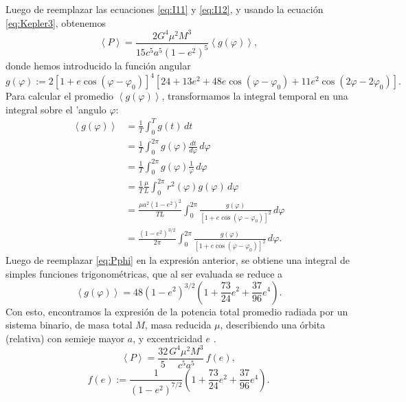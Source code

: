Luego de reemplazar las ecuaciones \ref{eq:I11} y \ref{eq:I12}, y usando la ecuación \ref{eq:Kepler3}, obtenemos
\begin{equation*}
\left\langle P\right\rangle = \frac{2G^4\mu^2M^3}{15c^5a^5\left(1-e^2\right)^{5}}\left\langle g(\varphi)\right\rangle ,
\end{equation*}
donde hemos introducido la función angular
\begin{equation}\label{eq:Pphi}
g(\varphi):=2\left[1+e\cos(\varphi-\varphi_0)\right]^4
\left[24+13e^2+48e\cos(\varphi-\varphi_0) +11e^2\cos(2\varphi-2\varphi_0)\right].
\end{equation}
Para calcular el promedio $\left\langle g(\varphi)\right\rangle$, transformamos la integral temporal en una integral sobre el 'angulo $\varphi$:
\begin{align*}
\left\langle g(\varphi)\right\rangle &= \frac{1}{T}\int_0^T g(t)\,dt \\
&= \frac{1}{T}\int_0^{2\pi} g(\varphi)\frac{dt}{d\varphi}\,d\varphi \\
&= \frac{1}{T}\int_0^{2\pi} g(\varphi)\frac{1}{\dot{\varphi}}\,d\varphi \\
&= \frac{1}{T}\frac{\mu}{L}\int_0^{2\pi} r^2(\varphi)g(\varphi)\,d\varphi \\
&= \frac{\mu a^2(1-e^2)^2}{TL}\int_0^{2\pi} \frac{g(\varphi)}{\left[1+e\cos(\varphi-\varphi_0)\right]^2}\,d\varphi \\
&= \frac{(1-e^2)^{3/2}}{2\pi}\int_0^{2\pi} \frac{g(\varphi)}{\left[1+e\cos(\varphi-\varphi_0)\right]^2}\,d\varphi.
\end{align*}
Luego de reemplazar \ref{eq:Pphi} en la expresión anterior, se obtiene una integral de simples funciones trigonométricas, que al ser evaluada se reduce a
\begin{equation*}
\left\langle g(\varphi)\right\rangle= 48(1-e^2)^{3/2}\left(1+\frac{73}{24}e^2+\frac{37}{96}e^4\right).
\end{equation*}
Con esto, encontramos la expresión de la potencia total promedio radiada por un sistema binario, de masa total $M$, masa reducida $\mu$, describiendo una órbita (relativa) con semieje mayor $a$, y excentricidad $e$ \cite{PhysRev.131.435}.
\begin{equation}\label{eq:PSbin}
\left\langle P\right\rangle =\frac{32}{5}\frac{G^4\mu^2M^3}{c^5a^5}\,f(e),
\end{equation}
\begin{equation*}
f(e):=\frac{1}{\left(1-e^2\right)^{7/2}}\left(1+\frac{73}{24}e^2+\frac{37}{96}e^4\right).
\end{equation*}
